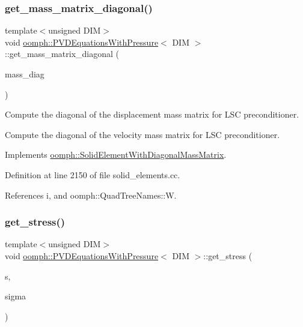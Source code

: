\subsubsection{\texorpdfstring{get\+\_\+mass\+\_\+matrix\+\_\+diagonal()}{get\_mass\_matrix\_diagonal()}}
{\footnotesize\ttfamily template$<$unsigned D\+IM$>$ \\
void \hyperlink{classoomph_1_1PVDEquationsWithPressure}{oomph\+::\+P\+V\+D\+Equations\+With\+Pressure}$<$ D\+IM $>$\+::get\+\_\+mass\+\_\+matrix\+\_\+diagonal (\begin{DoxyParamCaption}\item[{\hyperlink{classoomph_1_1Vector}{Vector}$<$ double $>$ \&}]{mass\+\_\+diag }\end{DoxyParamCaption})\hspace{0.3cm}{\ttfamily [virtual]}}



Compute the diagonal of the displacement mass matrix for L\+SC preconditioner. 

Compute the diagonal of the velocity mass matrix for L\+SC preconditioner. 

Implements \hyperlink{classoomph_1_1SolidElementWithDiagonalMassMatrix_ad2335852a20987f6a6c8e0d6ce5bc3af}{oomph\+::\+Solid\+Element\+With\+Diagonal\+Mass\+Matrix}.



Definition at line 2150 of file solid\+\_\+elements.\+cc.



References i, and oomph\+::\+Quad\+Tree\+Names\+::W.

\mbox{\label{classoomph_1_1PVDEquationsWithPressure_a15cfb4084a47c24f7cf108554a4b850d}} 
\subsubsection{\texorpdfstring{get\+\_\+stress()}{get\_stress()}\hspace{0.1cm}{\footnotesize\ttfamily [1/3]}}
{\footnotesize\ttfamily template$<$unsigned D\+IM$>$ \\
void \hyperlink{classoomph_1_1PVDEquationsWithPressure}{oomph\+::\+P\+V\+D\+Equations\+With\+Pressure}$<$ D\+IM $>$\+::get\+\_\+stress (\begin{DoxyParamCaption}\item[{const \hyperlink{classoomph_1_1Vector}{Vector}$<$ double $>$ \&}]{s,  }\item[{\hyperlink{classoomph_1_1DenseMatrix}{Dense\+Matrix}$<$ double $>$ \&}]{sigma }\end{DoxyParamCaption})\hspace{0.3cm}{\ttfamily [virtual]}}



